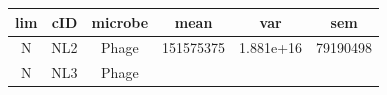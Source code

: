 \documentclass[]{article}
\begin{document}
\begin{longtable}[]{@{}cccccc@{}}
\toprule
\begin{minipage}[b]{0.07\columnwidth}\centering\strut
lim
\strut\end{minipage} &
\begin{minipage}[b]{0.07\columnwidth}\centering\strut
cID
\strut\end{minipage} &
\begin{minipage}[b]{0.12\columnwidth}\centering\strut
microbe
\strut\end{minipage} &
\begin{minipage}[b]{0.12\columnwidth}\centering\strut
mean
\strut\end{minipage} &
\begin{minipage}[b]{0.12\columnwidth}\centering\strut
var
\strut\end{minipage} &
\begin{minipage}[b]{0.12\columnwidth}\centering\strut
sem
\strut\end{minipage}\tabularnewline
\midrule
\endhead
\begin{minipage}[t]{0.07\columnwidth}\centering\strut
N
\strut\end{minipage} &
\begin{minipage}[t]{0.07\columnwidth}\centering\strut
NL2
\strut\end{minipage} &
\begin{minipage}[t]{0.12\columnwidth}\centering\strut
Phage
\strut\end{minipage} &
\begin{minipage}[t]{0.12\columnwidth}\centering\strut
151575375
\strut\end{minipage} &
\begin{minipage}[t]{0.12\columnwidth}\centering\strut
1.881e+16
\strut\end{minipage} &
\begin{minipage}[t]{0.12\columnwidth}\centering\strut
79190498
\strut\end{minipage}\tabularnewline
\begin{minipage}[t]{0.07\columnwidth}\centering\strut
N
\strut\end{minipage} &
\begin{minipage}[t]{0.07\columnwidth}\centering\strut
NL3
\strut\end{minipage} &
\begin{minipage}[t]{0.12\columnwidth}\centering\strut
Phage
\strut\end{minipage} &
\begin{minipage}[t]{0.12\columnwidth}\centering\strut

\end{minipage}
\end{longtable}
\end{document}
